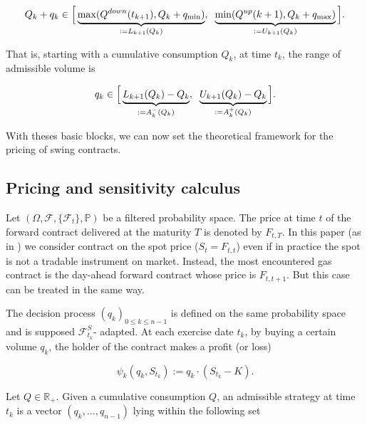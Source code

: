 \documentclass{article}
\numberwithin{equation}{section}
\begin{document}
\begin{equation}
    Q_k + q_k \in \Big[\underbrace{\max(Q^{down}(t_{k+1}), Q_{k} + q_{\min})}_{:= L_{{k+1}}(Q_k)}, \hspace{0.2cm}  \underbrace{\min(Q^{up}({k+1}), Q_{k} + q_{\max})}_{:= U_{{k+1}}(Q_k)}\Big].
    \label{range_cum_vol}
\end{equation}

\noindent
That is, starting with a cumulative consumption $Q_{k}$, at time $t_k$, the range of admissible volume is

\begin{equation}
    q_k \in \Big[\underbrace{L_{{k+1}}(Q_k) - Q_k}_{:= A_k^{-}(Q_k)}, \hspace{0.2cm}  \underbrace{U_{{k+1}}(Q_k) - Q_k}_{:= A_k^{+}(Q_k)}\Big].
    \label{intervalle_control}
\end{equation}


With theses basic blocks, we can now set the theoretical framework for the pricing of swing contracts.


\subsection{Pricing and sensitivity calculus}
\label{pricing}

\indent

Let $\left(\Omega, \mathcal{F}, \{ \mathcal{F}_t \}, \mathbb{P} \right)$ be a filtered probability space. The price at time $t$ of the forward contract delivered at the maturity $T$ is denoted by $F_{t, T}$. In this paper (as in \cite{Bardou2009OptimalQF, BarreraEsteve2006NumericalMF}) we consider contract on the spot price ($S_t = F_{t,t}$) even if in practice the spot is not a tradable instrument on market. Instead, the most encountered gas contract is the day-ahead forward contract whose price is  $F_{t, t+1}$. But this case can be treated in the same way.

The decision process $(q_{k})_{0 \le k \le n-1}$ is defined on the same probability space and is supposed $\mathcal{F}_{t_k}^S$- adapted. At each exercise date $t_k$, by buying a certain volume $q_k$, the holder of the contract makes a profit (or loss)

\begin{equation}
\psi_k\left(q_{k}, S_{t_k} \right) := q_{k} \cdot\left(S_{t_k} - K\right).
\end{equation}

Let $Q \in \mathbb{R}_{+}$. Given a cumulative consumption $Q$, an admissible strategy at time $t_k$ is a vector $(q_k, \ldots, q_{n-1})$ lying within the following set
\end{document}
